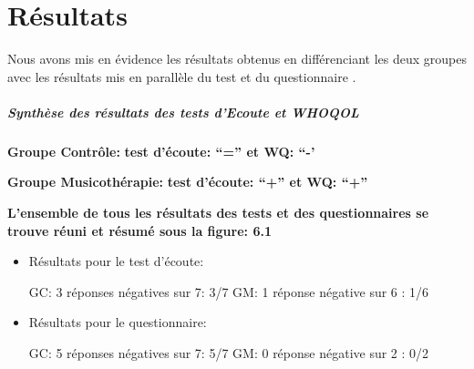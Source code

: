  	
 	
 
%                                 
                                 
  
  
   \chapter{Résultats}
   Nous avons mis en évidence les résultats obtenus en différenciant les deux groupes avec les résultats 
   mis en parallèle du test et du questionnaire .
   
    \paragraph{Synthèse  des résultats  des tests d'Ecoute et WHOQOL}
    
  \textbf{Groupe Contrôle:} 	          \textbf{ test d'écoute: ``=''   et    WQ: ``-'}
  
  
  \textbf{Groupe Musicothérapie:}     \textbf{test d'écoute: ``+''      et    WQ: ``+''}
  
  \textbf{L'ensemble de tous les résultats des tests et des questionnaires se trouve réuni et résumé 
  	sous  la figure:  6.1}  
   \begin{itemize}
  	
  \item Résultats pour le test d'écoute: 
  
  GC: 3 réponses négatives sur 7:       3/7 
  GM: 1 réponse négative sur 6    :       1/6
  
  \item Résultats pour le questionnaire:    
  
  
  GC: 5 réponses négatives sur 7:       5/7 
  GM: 0 réponse négative sur 2    :       0/2
   \end{itemize}

